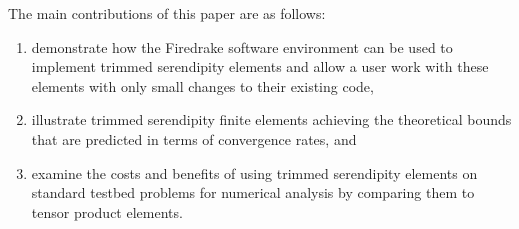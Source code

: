 \documentclass[manuscript,screen]{acmart}
\newcommand{\calS}{\mathcal{S}}
\begin{document}
  
  
  
  The main contributions of this paper are as follows:
  \begin{enumerate}
      \item demonstrate how the Firedrake software environment can be used to implement trimmed serendipity elements and allow a user work with these elements with only small changes to their existing code, 
      \item illustrate trimmed serendipity finite elements achieving the theoretical bounds that are predicted in terms of convergence rates, and  
      \item examine the costs and benefits of using trimmed serendipity elements on standard testbed problems for numerical analysis by comparing them to tensor product elements.
  \end{enumerate}
  
  
  
\end{document}
